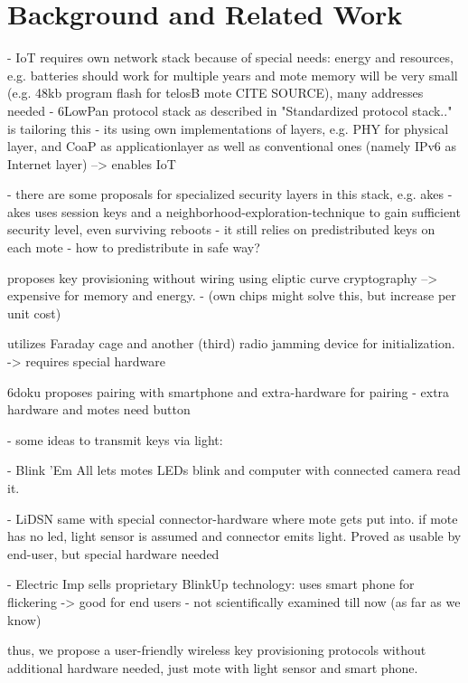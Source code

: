 \documentclass{sig-alternate} %
\begin{document}
\section{Background and Related Work}
\label{sec:related_work}

- IoT requires own network stack because of special needs: energy and resources, e.g. batteries should work for multiple years and mote memory will be very small (e.g. 48kb program flash for telosB mote CITE SOURCE), many addresses needed
- 6LowPan protocol stack as described in "Standardized protocol stack.." is tailoring this
- its using own implementations of layers, e.g. PHY for physical layer, and CoaP as applicationlayer as well as conventional ones (namely IPv6 as Internet layer) --> enables IoT

- there are some proposals for specialized security layers in this stack, e.g. akes \cite{krentz15akes}
- akes uses session keys and a neighborhood-exploration-technique to gain sufficient security level, even surviving reboots
- it still relies on predistributed keys on each mote
- how to predistribute in safe way?

\cite{chen2011over} proposes key provisioning without wiring using eliptic curve cryptography --> expensive for memory and energy.
- (own chips might solve this, but increase per unit cost)

\cite{kuo2007message} utilizes Faraday cage and another (third) radio jamming device for initialization.
-> requires special hardware

6doku \cite{krentz20156doku} proposes pairing with smartphone and extra-hardware for pairing
- extra hardware and motes need button

- some ideas to transmit keys via light:

- Blink 'Em All \cite{saxena2009blink} lets motes LEDs blink and computer with connected camera read it.

- LiDSN \cite{doan2012lidsn} same with special connector-hardware where mote gets put into. if mote has no led, light sensor is assumed and connector emits light. Proved as usable by end-user, but special hardware needed

- Electric Imp \cite{electricimp} sells proprietary BlinkUp technology: uses smart phone for flickering -> good for end users
- not scientifically examined till now (as far as we know)

thus, we propose a user-friendly wireless key provisioning protocols without additional hardware needed, just mote with light sensor and smart phone.
\end{document}
